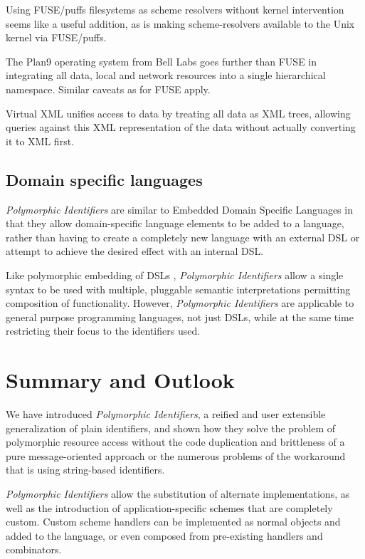 \documentclass[preprint,authoryear]{llncs}
\begin{document}
Using FUSE/puffs filesystems as scheme resolvers without kernel intervention seems
like a useful addition, as is making scheme-resolvers available to the Unix kernel
via FUSE/puffs.

The Plan9\cite{plan9names}\cite{plan9network} operating system from Bell Labs goes further than FUSE in integrating
all data, local and network resources into a single hierarchical namespace.  Similar
caveats as for FUSE apply.

Virtual XML\cite{Rose:2006:VXT:1150706.1150719} unifies access to data by treating all data as
XML trees, allowing queries against this XML representation of the data without
actually converting it to XML first.  


\subsection{Domain specific languages}

\emph{Polymorphic Identifiers} are similar to Embedded Domain Specific Languages\cite{edsl}
in that they allow domain-specific language elements to be added to a language, rather
than having to create a completely new language with an external DSL or attempt to 
achieve the desired effect with an internal DSL\cite{fowlerdsl}.  

Like polymorphic embedding of DSLs \cite{polydsl}, \emph{Polymorphic Identifiers} allow
a single syntax to be used with multiple, pluggable semantic interpretations permitting
composition of functionality\cite{embeddeddsl}.  However, \emph{Polymorphic Identifiers}
are applicable to general purpose programming languages, not just DSLs, while
at the same time restricting their focus to the identifiers used.



\section{Summary and Outlook}
\label{summary-and-outlook}

We have introduced \emph{Polymorphic Identifiers}, a reified and user extensible 
generalization of plain identifiers, and shown how they
solve the problem of polymorphic resource access without
the code duplication and brittleness of a pure message-oriented approach or the
numerous problems of the workaround that is using string-based identifiers.

\emph{Polymorphic Identifiers} allow the substitution of alternate implementations,
as well as the introduction of 
application-specific schemes that are completely custom.
Custom scheme handlers can be implemented as normal objects and added
to the language, or even composed from pre-existing handlers and
combinators.
\end{document}

